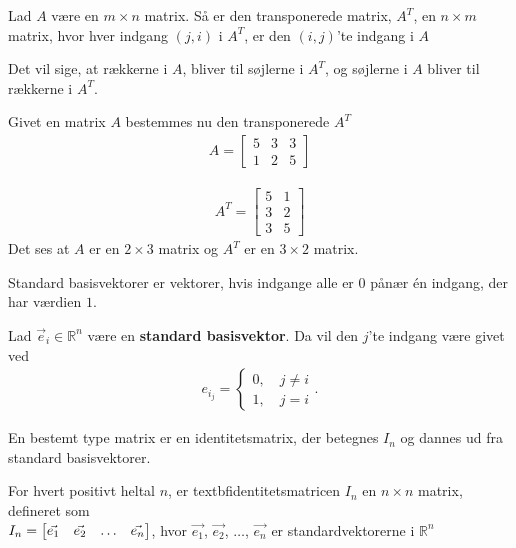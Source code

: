 \begin{defn}
Lad $A$ være en $m \times n$ matrix. Så er den transponerede matrix, $A^T$, en $n \times m$ matrix, hvor hver indgang $(j,i)$ i $A^T$, er den $(i,j)$'te indgang i $A$
\label{def:(transmatrix)} 
\end{defn}
Det vil sige, at rækkerne i $A$, bliver til søjlerne i $A^T$, og søjlerne i $A$ bliver til rækkerne i $A^T$.

\begin{eks}
Givet en matrix $A$ bestemmes nu den transponerede $A^T$
\begin{align*}
A = \begin{bmatrix}
	5 & 3 & 3 \\
	1 & 2 & 5
\end{bmatrix}
\end{align*}

\begin{align*}
A^T = \begin{bmatrix}
	5 & 1  \\
	3 & 2  \\
	3 & 5
\end{bmatrix}
\end{align*}
Det ses at $A$ er en $2 \times 3$ matrix og $A^T$ er en $3 \times 2$ matrix. 
\end{eks}


Standard basisvektorer er vektorer, hvis indgange alle er $0$ pånær én indgang, der har værdien $1$.

\begin{defn}
Lad $\vec{e}_{i}\in\mathds{R}^n$ være en \textbf{standard basisvektor}. Da vil den $j$'te indgang være givet ved
\begin{align*}
e_{i_{j}}=\begin{cases} 0, \quad j \neq i
\\ 1 , \quad j = i \end{cases}.
\end{align*}

\end{defn}

En bestemt type matrix er en identitetsmatrix, der betegnes $I_n$ og dannes ud fra standard basisvektorer. 

\begin{defn} [Identitetsmatrix]
For hvert positivt heltal $n$, er textbf{identitetsmatricen} $I_n$ en $n \times n$ matrix, defineret som\\ $I_n = \begin{bmatrix} \vec{e_1} & \vec{e_2} & \dots &  \vec{e_n} \end{bmatrix}$, hvor $\vec{e_1}$, $\vec{e_2}$, $\dots$, $\vec{e_n}$ er standardvektorerne i $\mathds{R}^n$
\label{def:imatrix}
\end{defn}

